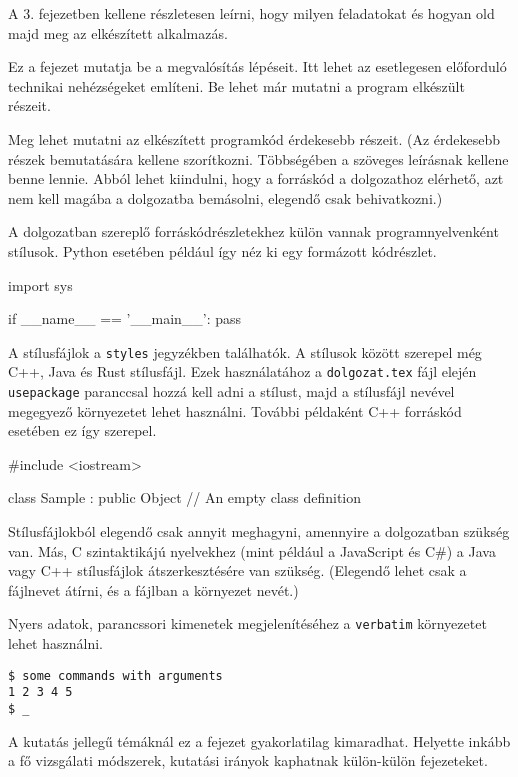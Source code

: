 
A 3. fejezetben kellene részletesen leírni, hogy milyen feladatokat és hogyan old majd meg az elkészített alkalmazás.

Ez a fejezet mutatja be a megvalósítás lépéseit.
Itt lehet az esetlegesen előforduló technikai nehézségeket említeni.
Be lehet már mutatni a program elkészült részeit.

Meg lehet mutatni az elkészített programkód érdekesebb részeit.
(Az érdekesebb részek bemutatására kellene szorítkozni.
Többségében a szöveges leírásnak kellene benne lennie.
Abból lehet kiindulni, hogy a forráskód a dolgozathoz elérhető, azt nem kell magába a dolgozatba bemásolni, elegendő csak behivatkozni.)

A dolgozatban szereplő forráskódrészletekhez külön vannak programnyelvenként stílusok.
Python esetében például így néz ki egy formázott kódrészlet.
\begin{python}
import sys

if __name__ == '__main__':
    pass
\end{python}

A stílusfájlok a \texttt{styles} jegyzékben találhatók.
A stílusok között szerepel még C++, Java és Rust stílusfájl.
Ezek használatához a \texttt{dolgozat.tex} fájl elején \texttt{usepackage} paranccsal hozzá kell adni a stílust, majd a stílusfájl nevével megegyező környezetet lehet használni.
További példaként C++ forráskód esetében ez így szerepel.
\begin{cpp}
#include <iostream>

class Sample : public Object
{
    // An empty class definition
}
\end{cpp}
Stílusfájlokból elegendő csak annyit meghagyni, amennyire a dolgozatban szükség van.
Más, C szintaktikájú nyelvekhez (mint például a JavaScript és C\#) a Java vagy C++ stílusfájlok átszerkesztésére van szükség.
(Elegendő lehet csak a fájlnevet átírni, és a fájlban a környezet nevét.)

Nyers adatok, parancssori kimenetek megjelenítéséhez a \texttt{verbatim} környezetet lehet használni.
\begin{verbatim}
$ some commands with arguments
1 2 3 4 5
$ _
\end{verbatim}

A kutatás jellegű témáknál ez a fejezet gyakorlatilag kimaradhat.
Helyette inkább a fő vizsgálati módszerek, kutatási irányok kaphatnak külön-külön fejezeteket.
